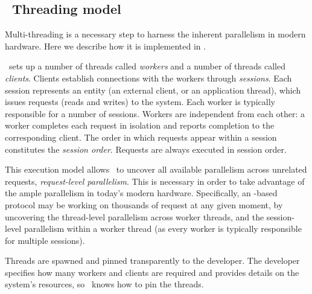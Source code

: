 


\subsection{\odlib~Threading model}\label{sec:ex-mod}


Multi-threading is a necessary step to harness the inherent parallelism in modern hardware. Here we describe how it is implemented in \odlib.

\odlib~sets up a number of threads called \emph{workers} and a number of threads called \emph{clients}. 
Clients establish connections with the workers through \emph{sessions}. 
Each session represents an entity (\eg an external client, or an application thread), which issues requests (reads and writes) to the system.
Each worker is typically responsible for a number of sessions. 
Workers are independent from each other: a worker completes each request in isolation and reports completion 
to the corresponding client. 
The order in which requests appear within a session constitutes the \emph{session order}. 
Requests are always executed in session order.

This execution model allows \odlib~to uncover all available parallelism across unrelated requests, \ie \emph{request-level parallelism}. This is necessary in order to take advantage of the ample parallelism in today's modern hardware.
Specifically, an \odlib-based protocol may be working on thousands of request at any given moment, by uncovering
the thread-level parallelism across worker threads, 
and the ses\-sion-level parallelism within a worker thread (as every worker is typically responsible for multiple sessions).

Threads are spawned and pinned transparently to the developer.
The developer specifies how many workers and clients are required and provides details on the system's resources, so \odlib~knows how to pin the threads.


